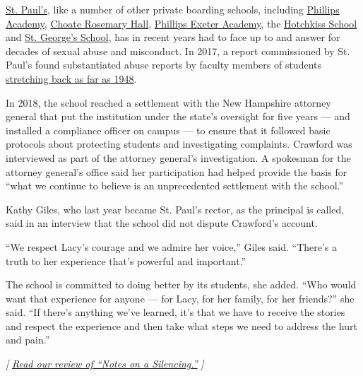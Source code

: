 \href{https://www.nytimes.com/2018/05/03/us/stpauls-boarding-school-abuse.html}{St.
Paul's}, like a number of other private boarding schools, including
\href{https://www.nytimes.com/2017/07/31/nyregion/second-phillips-andover-sex-abuse-report-includes-teacher-named-by-choate.html}{Phillips
Academy},
\href{https://www.nytimes.com/2017/04/13/nyregion/sexual-abuse-choate-connecticut-school.html}{Choate
Rosemary Hall},
\href{https://www.nytimes.com/2016/04/18/us/prep-schools-wrestle-with-sex-abuse-accusations-against-teachers.html}{Phillips
Exeter Academy}, the
\href{https://www.nytimes.com/2018/08/17/nyregion/hotchkiss-school-sexual-misconduct.html}{Hotchkiss
School} and
\href{https://www.nytimes.com/2016/01/06/us/40-alumni-assert-sexual-abuse-at-a-rhode-island-prep-school.html}{St.
George's School}, has in recent years had to face up to and answer for
decades of sexual abuse and misconduct. In 2017, a report commissioned
by St. Paul's found substantiated abuse reports by faculty members of
students
\href{https://www.nytimes.com/2017/05/22/us/st-pauls-school-acknowledges-decades-of-sexual-misconduct.html}{stretching
back as far as 1948}.

In 2018, the school reached a settlement with the New Hampshire attorney
general that put the institution under the state's oversight for five
years --- and installed a compliance officer on campus --- to ensure
that it followed basic protocols about protecting students and
investigating complaints. Crawford was interviewed as part of the
attorney general's investigation. A spokesman for the attorney general's
office said her participation had helped provide the basis for ``what we
continue to believe is an unprecedented settlement with the school.''

Kathy Giles, who last year became St. Paul's rector, as the principal is
called, said in an interview that the school did not dispute Crawford's
account.

``We respect Lacy's courage and we admire her voice,'' Giles said.
``There's a truth to her experience that's powerful and important.''

The school is committed to doing better by its students, she added.
``Who would want that experience for anyone --- for Lacy, for her
family, for her friends?'' she said. ``If there's anything we've
learned, it's that we have to receive the stories and respect the
experience and then take what steps we need to address the hurt and
pain.''

\emph{{[}}
\href{https://www.nytimes.com/2020/07/07/books/review/notes-on-a-silencing-lacy-crawford.html}{\emph{Read
our review of ``Notes on a Silencing.''}} \emph{{]}}

